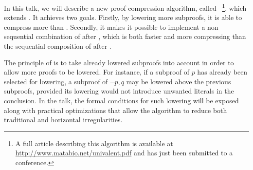 \documentclass{easychair}
\begin{document}
In this talk, we will describe a new proof compression algorithm, called
\LowerUnivalents~\footnote{A full article describing this algorithm is available at
\url{http://www.matabio.net/univalent.pdf} and has just been submitted to a conference.}, which
extends \LowerUnits. It achieves two goals. Firstly, by lowering more subproofs, it is able to
compress more than \LowerUnits. Secondly, it makes it possible to implement a non-sequential
combination of \LowerUnivalents after \RecyclePivotsIntersection, which is both faster and more
compressing than the sequential composition of \LowerUnits after \RecyclePivotsIntersection.

The principle of \LowerUnivalents is to take already lowered subproofs into account in order to
allow more proofs to be lowered. For instance, if a subproof of $p$ has already been selected for
lowering, a subproof of $\neg p, q$ may be lowered above the previous subproofs, provided its
lowering would not introduce unwanted literals in the conclusion. In the talk, the formal conditions
for such lowering will be exposed along with practical optimizations that allow the algorithm to
reduce both traditional and horizontal irregularities.




\end{document}
